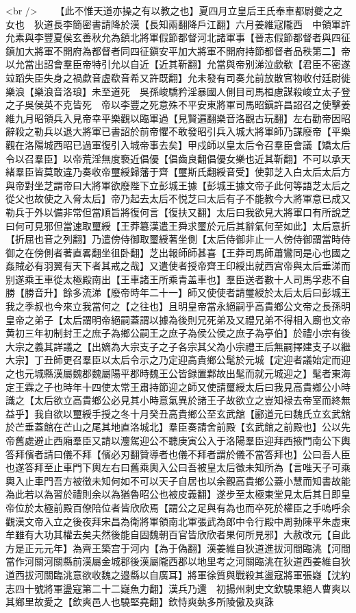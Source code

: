 <br />
　　【此不惟天道亦操之有以教之也】夏四月立皇后王氏奉車都尉夔之之女也　狄道長李簡密書請降於漢【長知兩翻降戶江翻】六月姜維寇隴西　中領軍許允素與李豐夏侯玄善秋允為鎮北將軍假節都督河北諸軍事【晉志假節都督者與四征鎮加大將軍不開府為都督者同四征鎭安平加大將軍不開府持節都督者品秩第二】帝以允當出詔會羣臣帝特引允以自近【近其靳翻】允當與帝别涕泣歔欷【君臣不密遂竝蹈失臣失身之禍歔音虚欷音希又許既翻】允未發有司奏允前放散官物收付廷尉徙樂浪【樂浪音洛琅】未至道死　吳孫峻驕矜淫暴國人側目司馬桓慮謀殺峻立太子登之子吳侯英不克皆死　帝以李豐之死意殊不平安東將軍司馬昭鎭許昌詔召之使擊姜維九月昭領兵入見帝幸平樂觀以臨軍過【見賢遍翻樂音洛觀古玩翻】左右勸帝因昭辭殺之勒兵以退大將軍已書詔於前帝懼不敢發昭引兵入城大將軍師乃謀廢帝【平樂觀在洛陽城西昭已過軍復引入城帝事去矣】甲戍師以皇太后令召羣臣會議【矯太后令以召羣臣】以帝荒淫無度䙝近倡優【倡齒良翻倡優女樂也近其靳翻】不可以承天緒羣臣皆莫敢違乃奏收帝璽綬歸藩于齊【璽斯氏翻綬音受】使郭芝入白太后太后方與帝對坐芝謂帝曰大將軍欲廢陛下立彭城王據【彭城王據文帝子此何等語芝太后之從父也故使之入脅太后】帝乃起去太后不悦芝曰太后有子不能教今大將軍意已成又勒兵于外以備非常但當順旨將復何言【復扶又翻】太后曰我欲見大將軍口有所說芝曰何可見邪但當速取璽綬【王莽簒漢遣王舜求璽於元后其辭氣何至如此】太后意折【折屈也音之列翻】乃遣傍侍御取璽綬著坐側【太后侍御非止一人傍侍御謂當時侍御之在傍側者著直畧翻坐徂卧翻】芝出報師師甚喜【王莽司馬師蕭鸞同是心也國之姦賊必有羽翼有天下者其戒之哉】又遣使者授帝齊王印綬出就西宫帝與太后垂涕而别遂乘王車從太極殿南出【王車諸王所乘青盖車也】羣臣送者數十人司馬孚悲不自勝【勝音升】餘多流涕【廢帝時年二十一】師又使使者請璽綬於太后太后曰彭城王我之季叔也今來立我當何之【之往也】且明皇帝當永絕嗣乎高貴鄉公文帝之長孫明皇帝之弟子【太后謂明帝絕嗣蓋謂以據為後則兄死弟及又禮兄弟不得相入廟也文帝黄初三年初制封王之庶子為鄉公嗣王之庶子為侯公侯之庶子為亭伯】於禮小宗有後大宗之義其詳議之【出嫡為大宗支子之子各宗其父為小宗禮王后無嗣擇建支子以繼大宗】丁丑師更召羣臣以太后令示之乃定迎高貴鄉公髦於元城【定迎者議始定而迎之也元城縣漢屬魏郡魏屬陽平郡時魏王公皆録置鄴故出髦而就元城迎之】髦者東海定王霖之子也時年十四使太常王肅持節迎之師又使請璽綬太后曰我見高貴鄉公小時識之【太后欲立高貴鄉公必見其小時意氣異於諸王子故欲立之豈知禄去帝室而終無益乎】我自欲以璽綬手授之冬十月癸丑高貴鄉公至玄武舘【酈道元曰魏氏立玄武舘於芒垂蓋館在芒山之尾其地直洛城北】羣臣奏請舍前殿【玄武館之前殿也】公以先帝舊處避止西廂羣臣又請以灋駕迎公不聽庚寅公入于洛陽羣臣迎拜西掖門南公下輿答拜儐者請曰儀不拜【儐必刃翻贊導者也儀不拜者謂於儀不當答拜也】公曰吾人臣也遂答拜至止車門下輿左右曰舊乘輿入公曰吾被皇太后徵未知所為【言唯天子可乘輿入止車門吾方被徵未知何如不可以天子自居也以余觀高貴鄉公蓋小慧而知書故能為此若以為習於禮則余以為猶魯昭公也被皮義翻】遂步至太極東堂見太后其日即皇帝位於太極前殿百僚陪位者皆欣欣焉【謂公之足與有為也而卒死於權臣之手嗚呼余觀漢文帝入立之後夜拜宋昌為衛將軍領南北軍張武為郎中令行殿中周勃陳平朱虚東牟雖有大功其權去矣夫然後能自固魏朝百官皆欣欣者果何所見邪】大赦改元【自此方是正元元年】為齊王築宫于河内【為于偽翻】漢姜維自狄道進拔河間臨洮【河間當作河關河關縣前漢屬金城郡後漢屬隴西郡以地里考之河關臨洮在狄道西姜維自狄道西拔河關臨洮意欲收魏之邉縣以自廣耳】將軍徐質與戰殺其盪寇將軍張嶷【沈約志四十號將軍盪寇第二十二嶷魚力翻】漢兵乃還　初揚州刺史文欽驍果絕人曹爽以其鄉里故愛之【欽爽邑人也驍堅堯翻】欽恃爽埶多所陵傲及爽誅